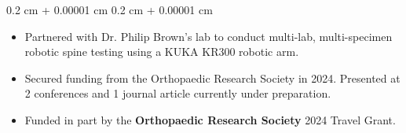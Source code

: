 \documentclass[10pt, letterpaper]{article}
\newenvironment{highlights}{
    \begin{itemize}[
        topsep=0.10 cm,
        parsep=0.10 cm,
        partopsep=0pt,
        itemsep=0pt,
        leftmargin=0.4 cm + 10pt
    ]
}{
    \end{itemize}
} %
\newenvironment{onecolentry}{
    \begin{adjustwidth}{
        0.2 cm + 0.00001 cm
    }{
        0.2 cm + 0.00001 cm
    }
}{
    \end{adjustwidth}
} %
\newenvironment{twocolentry}[2][]{
    \onecolentry
    \def\secondColumn{#2}
    \setcolumnwidth{\fill, 4.5 cm}
    \begin{paracol}{2}
}{
    \switchcolumn \raggedleft \secondColumn
    \end{paracol}
    \endonecolentry
} %
\let\hrefWithoutArrow\href
\renewcommand{\href}[2]{\hrefWithoutArrow{#1}{\ifthenelse{\equal{#2}{}}{ }{#2 }\raisebox{.15ex}{\footnotesize \faExternalLink*}}}
\begin{document}
        \vspace{0.10 cm}
        \begin{onecolentry}
            \begin{highlights}


               \item Partnered with Dr. Philip Brown’s lab to conduct multi-lab, multi-specimen robotic spine testing using a KUKA KR300 robotic arm.

               \item Secured funding from the Orthopaedic Research Society in 2024. Presented at 2 conferences and 1 journal article currently under preparation.

               \item Funded in part by the \textbf{Orthopaedic Research Society} 2024 Travel Grant.
               
            \end{highlights}
        \end{onecolentry}
        
     

            

        
\end{document}
